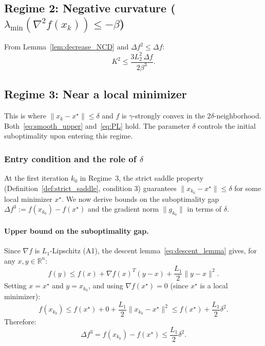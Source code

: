 \documentclass{article}
\begin{document}
\subsection{Regime 2: Negative curvature ($\lambda_{\min}(\nabla^2 f(x_k)) \leq -\beta$)}

From Lemma~\ref{lem:decrease_NCD} and $\Delta f^2 \leq \Delta f$:
\begin{equation}
\label{eq:regime2}
K^2 \leq \frac{3L_2^2\,\Delta f}{2\beta^3}.
\end{equation}

\subsection{Regime 3: Near a local minimizer}
\label{subsec:regime3}

This is where $\|x_k - x^\star\| \leq \delta$ and $f$ is $\gamma$-strongly convex in the $2\delta$-neighborhood. Both~\eqref{eq:smooth_upper} and~\eqref{eq:PL} hold. The parameter $\delta$ controls the initial suboptimality upon entering this regime.

\subsubsection{Entry condition and the role of $\delta$}
\label{subsubsec:entry}

At the first iteration $k_0$ in Regime~3, the strict saddle property (Definition~\ref{def:strict_saddle}, condition 3) guarantees $\|x_{k_0} - x^\star\| \leq \delta$ for some local minimizer $x^\star$. We now derive bounds on the suboptimality gap $\Delta f^3 := f(x_{k_0}) - f(x^\star)$ and the gradient norm $\|g_{k_0}\|$ in terms of $\delta$.

\paragraph{Upper bound on the suboptimality gap.} Since $\nabla f$ is $L_1$-Lipschitz (A1), the descent lemma~\eqref{eq:descent_lemma} gives, for any $x, y \in \mathbb{R}^n$:
\[
f(y) \leq f(x) + \nabla f(x)^T(y - x) + \frac{L_1}{2}\|y - x\|^2.
\]
Setting $x = x^\star$ and $y = x_{k_0}$, and using $\nabla f(x^\star) = 0$ (since $x^\star$ is a local minimizer):
\[
f(x_{k_0}) \leq f(x^\star) + 0 + \frac{L_1}{2}\|x_{k_0} - x^\star\|^2 \leq f(x^\star) + \frac{L_1}{2}\delta^2.
\]
Therefore:
\begin{equation}
\label{eq:entry_upper}
\Delta f^3 = f(x_{k_0}) - f(x^\star) \leq \frac{L_1}{2}\delta^2.
\end{equation}
\end{document}

